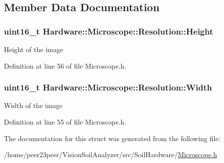 \subsection{Member Data Documentation}
\hypertarget{struct_hardware_1_1_microscope_1_1_resolution_aaa54a929acd6e8c224182a97264c85d1}{}
\subsubsection[{Height}]{\setlength{\rightskip}{0pt plus 5cm}uint16\+\_\+t Hardware\+::\+Microscope\+::\+Resolution\+::\+Height}\label{struct_hardware_1_1_microscope_1_1_resolution_aaa54a929acd6e8c224182a97264c85d1}
Height of the image 

Definition at line 56 of file Microscope.\+h.

\hypertarget{struct_hardware_1_1_microscope_1_1_resolution_a0e1ef543db0224230559cd9c6531aad2}{}
\subsubsection[{Width}]{\setlength{\rightskip}{0pt plus 5cm}uint16\+\_\+t Hardware\+::\+Microscope\+::\+Resolution\+::\+Width}\label{struct_hardware_1_1_microscope_1_1_resolution_a0e1ef543db0224230559cd9c6531aad2}
Width of the image 

Definition at line 55 of file Microscope.\+h.



The documentation for this struct was generated from the following file\+:\begin{DoxyCompactItemize}
\item 
/home/peer23peer/\+Vision\+Soil\+Analyzer/src/\+Soil\+Hardware/\hyperlink{_microscope_8h}{Microscope.\+h}\end{DoxyCompactItemize}
